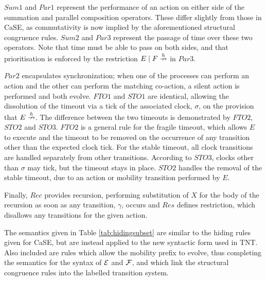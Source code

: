 \documentclass[orivec]{llncs}
\begin{document}
$Sum1$ and $Par1$ represent the performance of an action on either side
of the summation and parallel composition operators.  These differ
slightly from those in CaSE, as commutativity is now implied by the
aforementioned structural congruence rules.  $Sum2$ and $Par3$ represent
the passage of time over these two operators.  Note that time must be
able to pass on both sides, and that prioritisation is enforced by the
restriction $E \;|\; F \stackrel{h}{\nrightarrow}$ in $Par3$.

$Par2$ encapsulates synchronization; when one of the processes can
perform an action and the other can perform the matching co-action, a
silent action is performed and both evolve.  $FTO1$ and $STO1$ are
identical, allowing the dissolution of the timeout via a tick of the
associated clock, $\sigma$, on the provision that $E \stackrel{h}{\nrightarrow}$.  The
difference between the two timeouts is demonstrated by $FTO2$, $STO2$
and $STO3$.  $FTO2$ is a general rule for the fragile timeout, which
allows $E$ to execute and the timeout to be removed on the occurrence of
any transition other than the expected clock tick.  For the stable
timeout, all clock transitions are handled separately from other
transitions.  According to $STO3$, clocks other than $\sigma$ may tick,
but the timeout stays in place.  $STO2$ handles the removal of the
stable timeout, due to an action or mobility transition performed by
$E$.

Finally, $Rec$ provides recursion, performing substitution of $X$ for
the body of the recursion as soon as any transition, $\gamma$, occurs
and $Res$ defines restriction, which disallows any transitions for the
given action.

The semantics given in Table \ref{tab:hidingsubset} are similar to the
hiding rules given for CaSE, but are instead applied to the new
syntactic form used in TNT.  Also included are rules which allow the
mobility prefix to evolve, thus completing the semantics for the syntax
of $\text{$\mathcal{E}$}$ and $\text{$\mathcal{F}$}$, and which link the structural congruence rules
into the labelled transition system.
\end{document}
